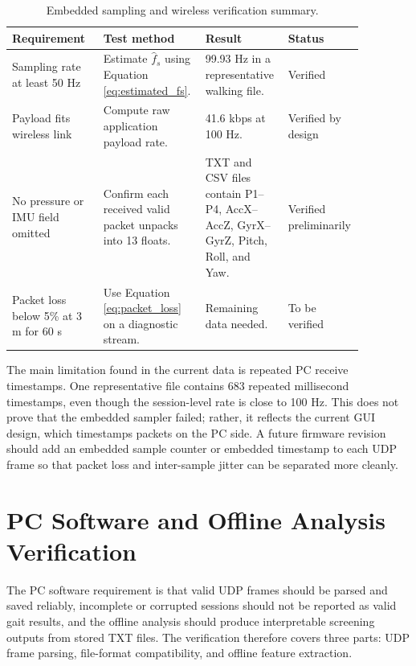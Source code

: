 \begin{table}[t]
\centering
\caption{Embedded sampling and wireless verification summary.}
\label{tab:embedded_wireless_verification}
\begin{tabular}{|p{0.25\linewidth}|p{0.25\linewidth}|p{0.22\linewidth}|p{0.15\linewidth}|}
\hline
Requirement & Test method & Result & Status \\
\hline
Sampling rate at least 50 Hz & Estimate $\hat{f}_s$ using Equation \eqref{eq:estimated_fs}. & 99.93 Hz in a representative walking file. & Verified \\
\hline
Payload fits wireless link & Compute raw application payload rate. & 41.6 kbps at 100 Hz. & Verified by design \\
\hline
No pressure or IMU field omitted & Confirm each received valid packet unpacks into 13 floats. & TXT and CSV files contain P1--P4, AccX--AccZ, GyrX--GyrZ, Pitch, Roll, and Yaw. & Verified preliminarily \\
\hline
Packet loss below 5\% at 3 m for 60 s & Use Equation \eqref{eq:packet_loss} on a diagnostic stream. & Remaining data needed. & To be verified \\
\hline
\end{tabular}
\end{table}

The main limitation found in the current data is repeated PC receive timestamps. One representative file contains 683 repeated millisecond timestamps, even though the session-level rate is close to 100 Hz. This does not prove that the embedded sampler failed; rather, it reflects the current GUI design, which timestamps packets on the PC side. A future firmware revision should add an embedded sample counter or embedded timestamp to each UDP frame so that packet loss and inter-sample jitter can be separated more cleanly.

\section{PC Software and Offline Analysis Verification}
\label{sec:pc_software_verification}

The PC software requirement is that valid UDP frames should be parsed and saved reliably, incomplete or corrupted sessions should not be reported as valid gait results, and the offline analysis should produce interpretable screening outputs from stored TXT files. The verification therefore covers three parts: UDP frame parsing, file-format compatibility, and offline feature extraction.

